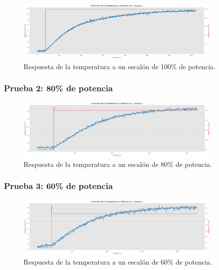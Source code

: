 \documentclass[spanish, a4paper, 11pt]{article}
\begin{document}
\begin{figure}[ht]
    \centering
    \includegraphics[width=0.9\textwidth]{./figures/prueba1.png}
    \caption{Respuesta de la temperatura a un escalón de 100\% de potencia.}
\end{figure}
\FloatBarrier

\newpage

\subsubsection{Prueba 2: 80\% de potencia}

\begin{figure}[ht]
    \centering
    \includegraphics[width=0.9\textwidth]{./figures/prueba2.png}
    \caption{Respuesta de la temperatura a un escalón de 80\% de potencia.}
\end{figure}
\FloatBarrier

\subsubsection{Prueba 3: 60\% de potencia}

\begin{figure}[ht]
    \centering
    \includegraphics[width=0.9\textwidth]{./figures/prueba3.png}
    \caption{Respuesta de la temperatura a un escalón de 60\% de potencia.}
\end{figure}
\FloatBarrier
\end{document}
